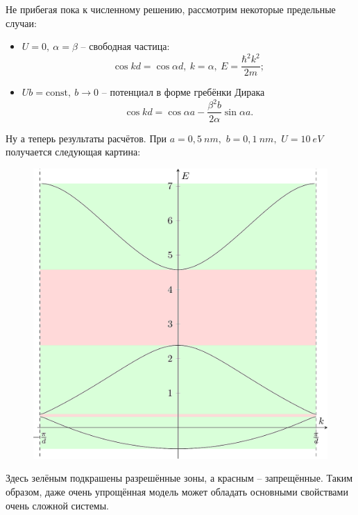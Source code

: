 Не прибегая пока к численному решению, рассмотрим некоторые предельные случаи:
\begin{itemize}
  \item \( U = 0,\ \alpha=\beta \) -- свободная частица: \[ \cos kd = \cos\alpha
    d,\ k = \alpha,\ E = \frac{\hbar^2 k^2}{2m}; \]
  \item \( Ub = \mathrm{const},\ b\to0 \) -- потенциал в форме гребёнки Дирака
    \[
        \cos kd = \cos\alpha a - \frac{\beta^2 b}{2\alpha}\sin\alpha a.
    \]
\end{itemize}
Ну а теперь результаты расчётов. При \( a = 0{,}5~nm,\) \( b = 0{,}1~nm,\)
\(U=10~eV \) получается следующая картина:
\begin{figure}[h!]
\center
\includegraphics[width=.5\textwidth]{2015-11-09-kronig-penney-bands.png}
\end{figure}

Здесь зелёным подкрашены разрешённые зоны, а красным -- запрещённые. Таким образом, даже очень упрощённая модель может обладать основными свойствами
очень сложной системы.
